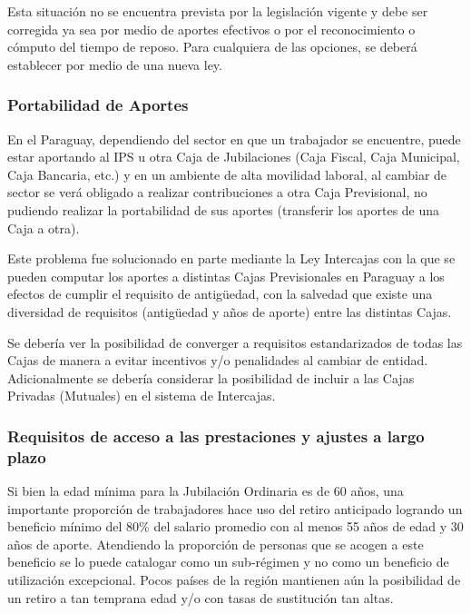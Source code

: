 \documentclass[a4paper,11pt]{article}
\begin{document}
\begin{enumerate}
Esta situación no se encuentra prevista por la legislación vigente y debe ser corregida ya sea por medio de aportes efectivos o por el reconocimiento o cómputo del tiempo de reposo.  Para cualquiera de las opciones, se deberá establecer por medio de una nueva ley.

\end{enumerate}

\subsubsection{Portabilidad de Aportes}

En el Paraguay, dependiendo del sector en que un trabajador se encuentre, puede estar aportando al IPS u otra Caja de Jubilaciones (Caja Fiscal, Caja Municipal, Caja Bancaria, etc.) y en un ambiente de alta movilidad laboral, al cambiar de sector se verá obligado a realizar contribuciones a otra Caja Previsional, no pudiendo realizar la portabilidad de sus aportes (transferir los aportes de una Caja a otra).

Este problema fue solucionado en parte mediante la Ley Intercajas con la que se pueden computar los aportes a distintas Cajas Previsionales en Paraguay a los efectos de cumplir el requisito de antigüedad, con la salvedad que existe una diversidad de requisitos (antigüedad y años de aporte) entre las distintas Cajas.

Se debería ver la posibilidad de converger a requisitos estandarizados de todas las Cajas de manera a evitar incentivos y/o penalidades al cambiar de entidad.  Adicionalmente se debería considerar la posibilidad de incluir a las Cajas Privadas (Mutuales) en el sistema de Intercajas.

\subsubsection{Requisitos de acceso a las prestaciones y ajustes a largo plazo}

Si bien la edad mínima para la Jubilación Ordinaria es de 60 años, una importante proporción de trabajadores hace uso del retiro anticipado logrando un beneficio mínimo del 80\% del salario promedio con al menos 55 años de edad y 30 años de aporte.  Atendiendo la proporción de personas que se acogen a este beneficio se lo puede catalogar como un sub-régimen y no como un beneficio de utilización excepcional. Pocos países de la región mantienen aún la posibilidad de un retiro a tan temprana edad y/o con tasas de sustitución tan altas.  
\end{document}
